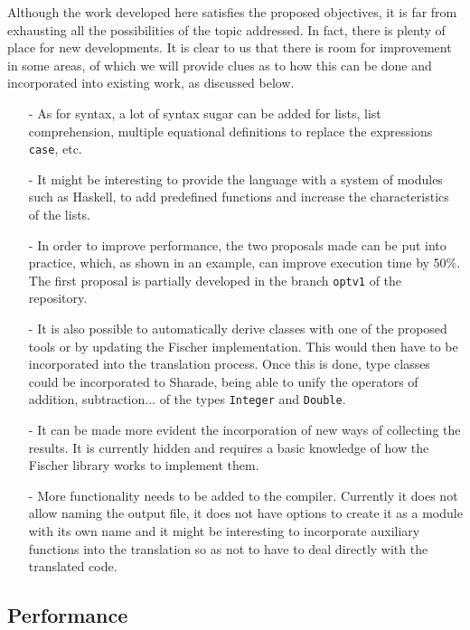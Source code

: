 \documentclass[class=article, crop=false]{standalone}
\begin{document}
Although the work developed here satisfies the proposed objectives, it is far from exhausting
all the possibilities of the topic addressed. In fact, there is plenty of place for new
developments. It is clear to us that there is room for improvement in some areas, of which we
will provide clues as to how this can be done and incorporated into existing work, as
discussed below.

\begin{itemize}
  \item[-] As for syntax, a lot of syntax sugar can be added for lists, list comprehension,
  multiple equational definitions to replace the expressions \verb`case`, etc.

  \item[-] It might be interesting to provide the language with a system of modules such as
  Haskell, to add predefined functions and increase the characteristics of the lists.

  \item[-] In order to improve performance, the two proposals made can be put into practice,
  which, as shown in an example, can improve execution time by 50\%. The first proposal is
  partially developed in the branch \verb`optv1` of the repository.

  \item[-] It is also possible to automatically derive classes with one of the proposed tools
  or by updating the Fischer implementation. This would then have to be incorporated into the
  translation process. Once this is done, type classes could be incorporated to Sharade,
  being able to unify the operators of addition, subtraction... of the types \verb`Integer`
  and \verb`Double`.

  \item[-] It can be made more evident the incorporation of new ways of collecting the
  results. It is currently hidden and requires a basic knowledge of how the Fischer library
  works to implement them.

  \item[-] More functionality needs to be added to the compiler. Currently it does not allow
  naming the output file, it does not have options to create it as a module with its own name
  and it might be interesting to incorporate auxiliary functions into the translation so as
  not to have to deal directly with the translated code.
\end{itemize}

\subsection{Performance}
\end{document}
